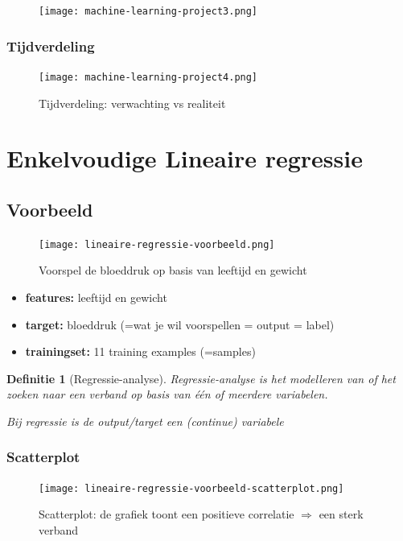 \documentclass{article}
\newtheorem{theorem}{Definitie}[section]
\begin{document}
\begin{figure}[H]
    \centering
    \texttt{[image: machine-learning-project3.png]}
\end{figure}

\subsubsection{Tijdverdeling}


\begin{figure}[H]
    \centering
    \texttt{[image: machine-learning-project4.png]}
    \caption{Tijdverdeling: verwachting vs realiteit}
\end{figure}

\section{Enkelvoudige Lineaire regressie}

\subsection{Voorbeeld}

\begin{figure}[H]
    \centering
    \texttt{[image: lineaire-regressie-voorbeeld.png]}
    \caption{Voorspel de bloeddruk op basis van leeftijd en gewicht}
\end{figure}

\begin{itemize}
    \item \textbf{features:} leeftijd en gewicht
    \item \textbf{target:} bloeddruk (=wat je wil voorspellen = output = label)
    \item \textbf{trainingset:} 11 training examples (=samples)
\end{itemize}

\begin{theorem}[Regressie-analyse]
Regressie-analyse is het modelleren van of het zoeken naar een verband op basis van één of meerdere variabelen.

Bij regressie is de output/target een (continue) variabele
\end{theorem}

\subsubsection{Scatterplot}

\begin{figure}[H]
    \centering
    \texttt{[image: lineaire-regressie-voorbeeld-scatterplot.png]}
    \caption{Scatterplot: de grafiek toont een positieve correlatie $\Rightarrow$ een sterk verband}
\end{figure}
\end{document}
